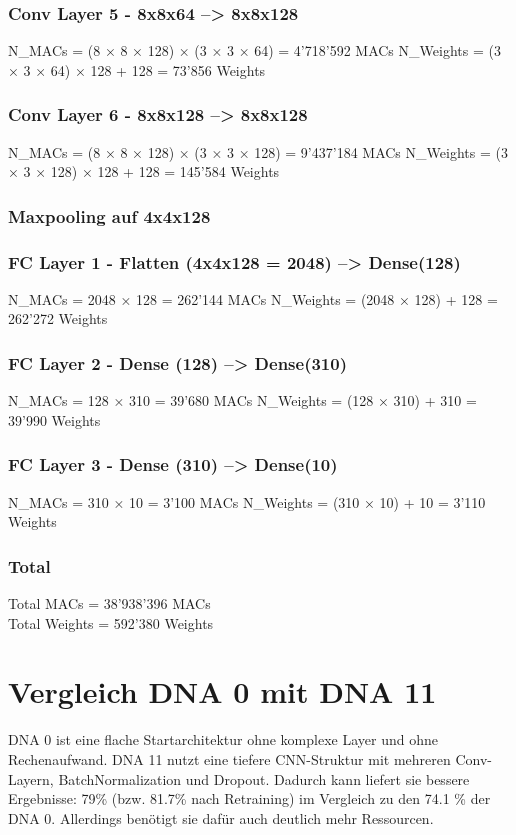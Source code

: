 \documentclass{article}
\begin{document}
\subsubsection{Conv Layer 5 - 8x8x64 --> 8x8x128}
N\_MACs = (8 × 8 × 128) × (3 × 3 × 64) = 4'718'592 MACs
N\_Weights = (3 × 3 × 64) × 128 + 128 = 73'856 Weights

\subsubsection{Conv Layer 6 - 8x8x128 --> 8x8x128}
N\_MACs = (8 × 8 × 128) × (3 × 3 × 128) = 9'437'184 MACs
N\_Weights = (3 × 3 × 128) × 128 + 128 = 145'584 Weights

\subsubsection{Maxpooling auf 4x4x128}

\subsubsection{FC Layer 1 - Flatten (4x4x128 = 2048) --> Dense(128)}
N\_MACs = 2048 × 128 = 262'144 MACs
N\_Weights = (2048 × 128) + 128 = 262'272 Weights

\subsubsection{FC Layer 2 - Dense (128) --> Dense(310)}
N\_MACs = 128 × 310 = 39'680 MACs
N\_Weights = (128 × 310) + 310 = 39'990 Weights

\subsubsection{FC Layer 3 - Dense (310) --> Dense(10)}
N\_MACs = 310 × 10 = 3'100 MACs
N\_Weights = (310 × 10) + 10 = 3'110 Weights

\subsubsection{Total}
Total MACs = 38'938'396 MACs\\
Total Weights = 592'380 Weights

\section{Vergleich DNA 0 mit DNA 11}
DNA 0 ist eine flache Startarchitektur ohne komplexe Layer und ohne Rechenaufwand. DNA 11 nutzt eine tiefere CNN-Struktur mit mehreren Conv-Layern, BatchNormalization
und Dropout. Dadurch kann liefert sie bessere Ergebnisse: 79\% (bzw. 81.7\% nach Retraining) im Vergleich zu den 74.1 \% der DNA 0. 
Allerdings benötigt sie dafür auch deutlich mehr Ressourcen. 
\end{document}
